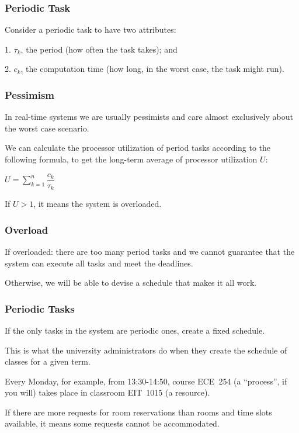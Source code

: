 \begin{frame}
\frametitle{Periodic Task}

Consider a periodic task to have two attributes: 

1. $\tau_{k}$, the period (how often the task takes); and 

2. $c_{k}$, the computation time (how long, in the worst case, the task might run).

\end{frame}

\begin{frame}
\frametitle{Pessimism}

In real-time systems we are usually pessimists and care almost exclusively about the worst case scenario. 

We can calculate the processor utilization of period tasks according to the following formula, to get the long-term average of processor utilization $U$:

\begin{center}
$U = \sum\limits_{k=1}^n\dfrac{c_{k}}{\tau_{k}}$
\end{center}

If $U > 1$, it means the system is overloaded. 

\end{frame}

\begin{frame}
\frametitle{Overload}
If overloaded: there are too many period tasks and we cannot guarantee that the system can execute all tasks and meet the deadlines. 

Otherwise, we will be able to devise a schedule that makes it all work.

\end{frame}

\begin{frame}
\frametitle{Periodic Tasks}

If the only tasks in the system are periodic ones, create a fixed schedule. 

This is what the university administrators do when they create the schedule of classes for a given term.

 Every Monday, for example, from 13:30-14:50, course ECE~254 (a ``process'', if you will) takes place in classroom EIT~1015 (a resource). 
 
If there are more requests for room reservations than rooms and time slots available, it means some requests cannot be accommodated.

\end{frame}


